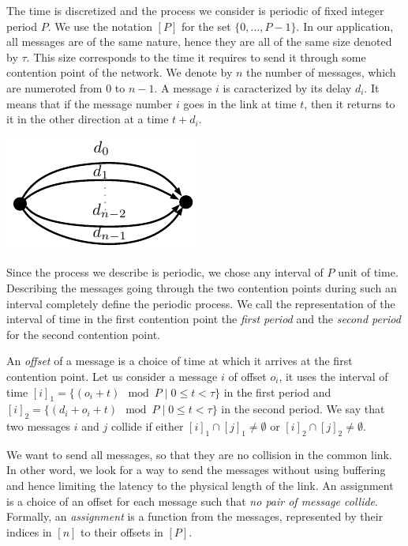 \documentclass[10pt, conference, letterpaper]{IEEEtran}
\begin{document}
The time is discretized and the process we consider is periodic of fixed integer period $P$. We use the notation $[P]$ for the set $\{0,\dots,P-1\}$. In our application, all messages are of the same nature, hence they are all of the same size denoted by $\tau$. This size corresponds to the time it requires to send it through some contention point of the network.
We denote by $n$ the number of messages, which are numeroted from $0$ to $n-1$. A message $i$ is caracterized by its delay $d_i$. It means that if the message number $i$ goes in the link at time $t$, then it returns to it in the other direction at a time $t + d_i$. 
\begin{center}
\includegraphics{distances}
\end{center}
Since the process we describe is periodic, we chose any interval of $P$ unit of time.
Describing the messages going through the two contention points during such an interval
completely define the periodic process. We call the representation of the interval
of time in the first contention point the \emph{first period} and the \emph{second period}
for the second contention point.

An \emph{offset} of a message is a choice of time at which it arrives
at the first contention point. Let us consider a message $i$
of offset $o_i$, it uses the interval of time $[i]_1 = \{ (o_i + t) \mod P \mid 0 \leq t < \tau \}$ in the first period and $[i]_2 = \{ (d_i + o_i + t) \mod P \mid 0 \leq t < \tau \}$ in the second period. We say that two messages $i$ and $j$ collide if either $[i]_1 \cap [j]_1 \neq \emptyset $ or $[i]_2 \cap [j]_2 \neq \emptyset $.

We want to send all messages, so that they are no collision in the common link.
In other word, we look for a way to send the messages without using buffering and 
hence limiting the latency to the physical length of the link. An assignment is a
choice of an offset for each message such that \emph{no pair of message collide}.
Formally, an \emph{assignment} is a function from the messages, represented by their indices in $[n]$ to their offsets in $[P]$.  
\end{document}
